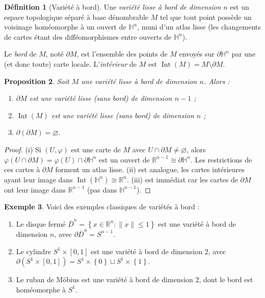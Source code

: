 \documentclass[12pt,a4paper,openany]{book}
\theoremstyle{definition}
\newtheorem{definition}{Définition}[chapter]
\newtheorem{exemple}[definition]{Exemple}
\theoremstyle{plain}
\newtheorem{proposition}[definition]{Proposition}
\theoremstyle{remark}
\newcommand{\R}{\mathbb{R}}
\newcommand{\set}[1]{\left\{#1\right\}}
\begin{document}
\begin{definition}[Variété à bord]\label{def:variete-bord}
Une \emph{variété lisse à bord de dimension $n$} est un espace topologique
séparé à base dénombrable $M$ tel que tout point possède un voisinage
homéomorphe à un ouvert de $\mathbb{H}^n$, muni d'un atlas lisse (les
changements de cartes étant des difféomorphismes entre ouverts de
$\mathbb{H}^n$).

Le \emph{bord} de $M$, noté $\partial M$, est
l'ensemble des points de $M$ envoyés sur $\partial \mathbb{H}^n$ par une (et
donc toute) carte locale. L'\emph{intérieur} de $M$ est $\operatorname{Int}(M)
= M \setminus \partial M$.
\end{definition}

\begin{proposition}\label{prop:bord-variete}
Soit $M$ une variété lisse à bord de dimension $n$. Alors :
\begin{enumerate}[label=(\roman*)]
    \item $\partial M$ est une variété lisse (sans bord) de dimension $n - 1$ ;
    \item $\operatorname{Int}(M)$ est une variété lisse (sans bord) de
    dimension $n$ ;
    \item $\partial(\partial M) = \varnothing$.
\end{enumerate}
\end{proposition}

\begin{proof}
(i) Si $(U, \varphi)$ est une carte de $M$ avec $U \cap \partial M \neq
\varnothing$, alors $\varphi(U \cap \partial M) = \varphi(U) \cap \partial
\mathbb{H}^n$ est un ouvert de $\R^{n-1} \cong \partial \mathbb{H}^n$. Les
restrictions de ces cartes à $\partial M$ forment un atlas lisse. (ii) est
analogue, les cartes intérieures ayant leur image dans
$\operatorname{Int}(\mathbb{H}^n) \cong \R^n$. (iii) est immédiat car les
cartes de $\partial M$ ont leur image dans $\R^{n-1}$ (pas dans
$\mathbb{H}^{n-1}$).
\end{proof}

\begin{exemple}\label{ex:varietes-bord}
Voici des exemples classiques de variétés à bord :
\begin{enumerate}[label=(\alph*)]
    \item Le disque fermé $\overline{D}^n = \set{x \in \R^n : \|x\| \leq 1}$
    est une variété à bord de dimension $n$, avec $\partial \overline{D}^n =
    S^{n-1}$.
    \item Le cylindre $S^1 \times [0,1]$ est une variété à bord de dimension $2$,
    avec $\partial(S^1 \times [0,1]) = S^1 \times \set{0} \sqcup S^1 \times
    \set{1}$.
    \item Le ruban de Möbius est une variété à bord de dimension $2$, dont le
    bord est homéomorphe à $S^1$.
\end{enumerate}
\end{exemple}
\end{document}
